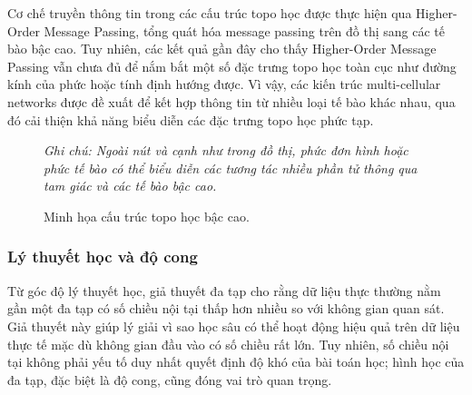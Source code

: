 Cơ chế truyền thông tin trong các cấu trúc topo học được thực hiện qua Higher-Order Message Passing, tổng quát hóa message passing trên đồ thị sang các tế bào bậc cao. Tuy nhiên, các kết quả gần đây cho thấy Higher-Order Message Passing vẫn chưa đủ để nắm bắt một số đặc trưng topo học toàn cục như đường kính của phức hoặc tính định hướng được. Vì vậy, các kiến trúc multi-cellular networks được đề xuất để kết hợp thông tin từ nhiều loại tế bào khác nhau, qua đó cải thiện khả năng biểu diễn các đặc trưng topo học phức tạp.

\begin{figure}[H]
    \centering
    
    \caption[Minh họa cấu trúc topo học bậc cao]{Minh họa cấu trúc topo học bậc cao.}
    \label{fig:topological-complex}
    
    \vspace{0.15cm}
    \begin{minipage}{0.9\linewidth}
        \centering
        \small\textit{Ghi chú: Ngoài nút và cạnh như trong đồ thị, phức đơn hình hoặc phức tế bào có thể biểu diễn các tương tác nhiều phần tử thông qua tam giác và các tế bào bậc cao.}
    \end{minipage}
\end{figure}

\subsubsection{Lý thuyết học và độ cong}

Từ góc độ lý thuyết học, giả thuyết đa tạp cho rằng dữ liệu thực thường nằm gần một đa tạp có số chiều nội tại thấp hơn nhiều so với không gian quan sát. Giả thuyết này giúp lý giải vì sao học sâu có thể hoạt động hiệu quả trên dữ liệu thực tế mặc dù không gian đầu vào có số chiều rất lớn. Tuy nhiên, số chiều nội tại không phải yếu tố duy nhất quyết định độ khó của bài toán học; hình học của đa tạp, đặc biệt là độ cong, cũng đóng vai trò quan trọng.

